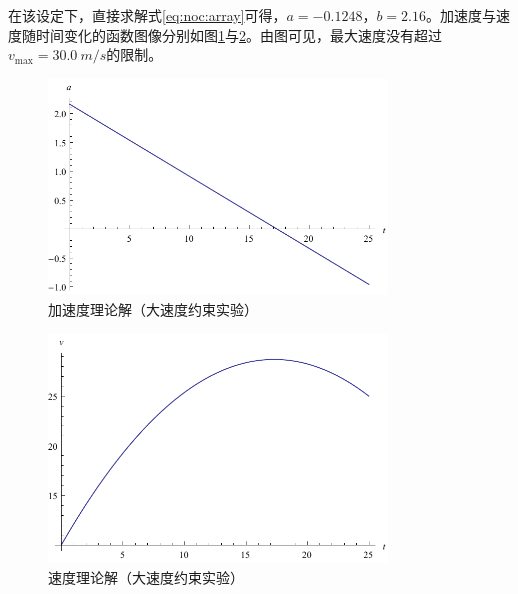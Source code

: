 在该设定下，直接求解式\ref{eq:noc:array}可得，$a=-0.1248$，$b=2.16$。加速度与速度随时间变化的函数图像分别如图\ref{fig:da}与\ref{fig:dv}。由图可见，最大速度没有超过$v_{\max}=\SI{30.0}{m\per s}$的限制。
\begin{figure}[htbp]
\centering
\includegraphics[width=9cm]{figures/vopt/da.pdf}
\caption{加速度理论解（大速度约束实验）}
\label{fig:da}
\end{figure}
\begin{figure}[htbp]
\centering
\includegraphics[width=9cm]{figures/vopt/dv.pdf}
\caption{速度理论解（大速度约束实验）}
\label{fig:dv}
\end{figure}

